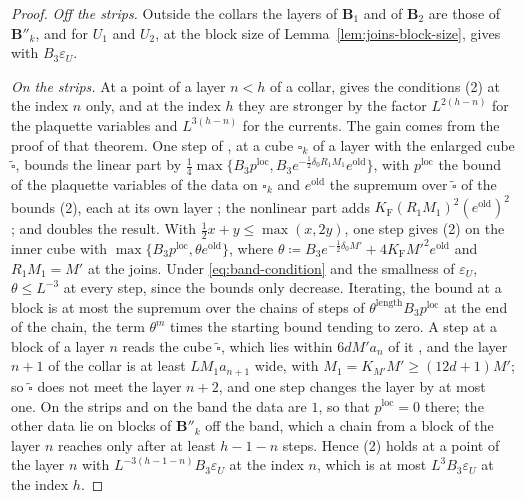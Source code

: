 \begin{proof}
\emph{Off the strips.} Outside the collars the layers of $\mathbf B_1$ and of $\mathbf B_2$ are those of $\mathbf B''_k$, and \cite[Theorem~1]{BalabanVAR} for $U_1$ and $U_2$, at the block size of Lemma~\ref{lem:joins-block-size}, gives \cite[(2)]{BalabanVAR} with $B_3\varepsilon_U$.

\emph{On the strips.} At a point of a layer $n < h$ of a collar, \cite[Theorem~1]{BalabanVAR} gives the conditions (2) at the index $n$ only, and at the index $h$ they are stronger by the factor $L^{2(h-n)}$ for the plaquette variables and $L^{3(h-n)}$ for the currents. The gain comes from the proof of that theorem. One step of \cite[Sect.~F, pp.~300--304]{BalabanVAR}, at a cube $\square_k$ of a layer with the enlarged cube $\tilde\square$, bounds the linear part by $\frac{1}{4}\max\{B_3p^{\mathrm{loc}}, B_3e^{-\frac{1}{2}\delta_0R_1M_1}e^{\mathrm{old}}\}$, with $p^{\mathrm{loc}}$ the bound of the plaquette variables of the data on $\square_k$ and $e^{\mathrm{old}}$ the supremum over $\tilde\square$ of the bounds (2), each at its own layer \cite[(161), (162)]{BalabanVAR}; the nonlinear part adds $K_{\mathrm F}(R_1M_1)^2(e^{\mathrm{old}})^2$ \cite[(165)]{BalabanVAR}; and \cite[(168)]{BalabanVAR} doubles the result. With $\frac{1}{2}x + y \leq \max(x, 2y)$, one step gives (2) on the inner cube with $\max\{B_3p^{\mathrm{loc}}, \theta e^{\mathrm{old}}\}$, where $\theta \coloneqq B_3e^{-\frac{1}{2}\delta_0M'} + 4K_{\mathrm F}M'^2e^{\mathrm{old}}$ and $R_1M_1 = M'$ at the joins. Under \eqref{eq:band-condition} and the smallness of $\varepsilon_U$, $\theta \leq L^{-3}$ at every step, since the bounds only decrease. Iterating, the bound at a block is at most the supremum over the chains of steps of $\theta^{\mathrm{length}}B_3p^{\mathrm{loc}}$ at the end of the chain, the term $\theta^m$ times the starting bound tending to zero. A step at a block of a layer $n$ reads the cube $\tilde\square$, which lies within $6dM'a_n$ of it \cite[p.~300, ll.~28--37]{BalabanVAR}, and the layer $n + 1$ of the collar is at least $LM_1a_{n+1}$ wide, with $M_1 = K_{M'}M' \geq (12d + 1)M'$; so $\tilde\square$ does not meet the layer $n + 2$, and one step changes the layer by at most one. On the strips and on the band the data are $1$, so that $p^{\mathrm{loc}} = 0$ there; the other data lie on blocks of $\mathbf B''_k$ off the band, which a chain from a block of the layer $n$ reaches only after at least $h - 1 - n$ steps. Hence (2) holds at a point of the layer $n$ with $L^{-3(h-1-n)}B_3\varepsilon_U$ at the index $n$, which is at most $L^3B_3\varepsilon_U$ at the index $h$.


\end{proof}
